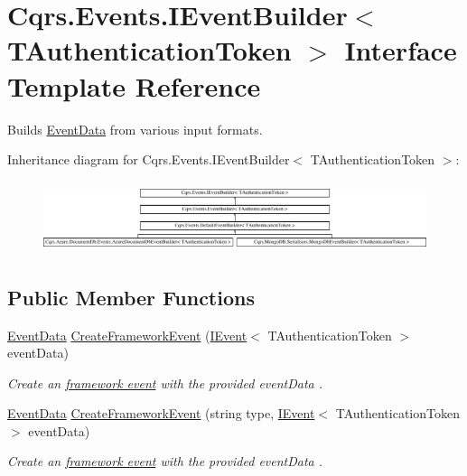 \hypertarget{interfaceCqrs_1_1Events_1_1IEventBuilder}{}\section{Cqrs.\+Events.\+I\+Event\+Builder$<$ T\+Authentication\+Token $>$ Interface Template Reference}
\label{interfaceCqrs_1_1Events_1_1IEventBuilder}


Builds \hyperlink{classCqrs_1_1Events_1_1EventData}{Event\+Data} from various input formats.  


Inheritance diagram for Cqrs.\+Events.\+I\+Event\+Builder$<$ T\+Authentication\+Token $>$\+:\begin{figure}[H]
\begin{center}
\leavevmode
\includegraphics[height=2.117202cm]{interfaceCqrs_1_1Events_1_1IEventBuilder}
\end{center}
\end{figure}
\subsection*{Public Member Functions}
\begin{DoxyCompactItemize}
\item 
\hyperlink{classCqrs_1_1Events_1_1EventData}{Event\+Data} \hyperlink{interfaceCqrs_1_1Events_1_1IEventBuilder_a3c0cb2db87e496ad64f481a6cce2c79d_a3c0cb2db87e496ad64f481a6cce2c79d}{Create\+Framework\+Event} (\hyperlink{interfaceCqrs_1_1Events_1_1IEvent}{I\+Event}$<$ T\+Authentication\+Token $>$ event\+Data)
\begin{DoxyCompactList}\small\item\em Create an \hyperlink{}{framework event} with the provided {\itshape event\+Data} . \end{DoxyCompactList}\item 
\hyperlink{classCqrs_1_1Events_1_1EventData}{Event\+Data} \hyperlink{interfaceCqrs_1_1Events_1_1IEventBuilder_ac77123302de4e79df9661c13219af4d4_ac77123302de4e79df9661c13219af4d4}{Create\+Framework\+Event} (string type, \hyperlink{interfaceCqrs_1_1Events_1_1IEvent}{I\+Event}$<$ T\+Authentication\+Token $>$ event\+Data)
\begin{DoxyCompactList}\small\item\em Create an \hyperlink{}{framework event} with the provided {\itshape event\+Data} . \end{DoxyCompactList}\end{DoxyCompactItemize}


